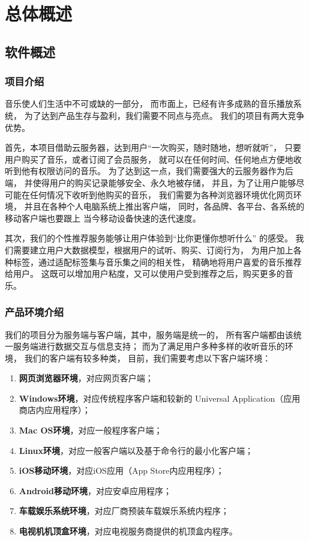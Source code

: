 \chapter{总体概述}

\section{软件概述}
\subsection{项目介绍}

音乐使人们生活中不可或缺的一部分，
    而市面上，已经有许多成熟的音乐播放系统，
    为了达到产品生存与盈利，我们需要不同点与亮点。
我们的\proname 项目有两大竞争优势。

首先，本项目借助云服务器，达到用户“一次购买，随时随地，想听就听”，
    只要用户购买了音乐，或者订阅了会员服务，
    就可以在任何时间、任何地点方便地收听到他有权限访问的音乐。
为了达到这一点，我们需要强大的云服务器作为后端，
    并使得用户的购买记录能够安全、永久地被存储，
    并且，为了让用户能够尽可能在任何情况下收听到他购买的音乐，
    我们需要为各种浏览器环境优化网页环境，
    并且在各种个人电脑系统上推出客户端，
    同时，各品牌、各平台、各系统的移动客户端也要跟上
    当今移动设备快速的迭代速度。

其次，我们的个性推荐服务能够让用户体验到“\proname 比你更懂你想听什么”
    的感受。
    我们需要建立用户大数据模型，根据用户的试听、购买、订阅行为，
    为用户加上各种标签，通过适配标签集与音乐集之间的相关性，
    精确地将用户喜爱的音乐推荐给用户。
这既可以增加用户粘度，又可以使用户受到推荐之后，购买更多的音乐。

\subsection{产品环境介绍}

我们的项目分为服务端与客户端，其中，服务端是统一的，
    所有客户端都由该统一服务端进行数据交互与信息支持；
    而为了满足用户多种多样的收听音乐的环境，
    我们的客户端有较多种类，
    目前，我们需要考虑以下客户端环境：
    \begin{enumerate}
        \item \textbf{网页浏览器环境}，对应网页客户端；
        \item \textbf{Windows环境}，对应传统程序客户端和较新的
        Universal Application（应用商店内应用程序）；
        \item \textbf{Mac OS环境}，对应一般程序客户端；
        \item \textbf{Linux环境}，对应一般客户端以及基于命令行的最小化客户端；
        \item \textbf{iOS移动环境}，对应iOS应用（App Store内应用程序）；
        \item \textbf{Android移动环境}，对应安卓应用程序；
        \item \textbf{车载娱乐系统环境}，对应厂商预装车载娱乐系统内程序；
        \item \textbf{电视机机顶盒环境}，对应电视服务商提供的机顶盒内程序。
    \end{enumerate}

